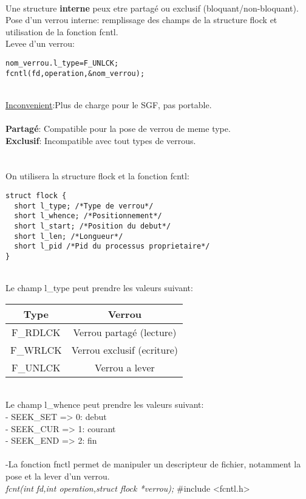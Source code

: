 \documentclass[a4paper,12pt,openany]{book}
\begin{document}
\\
Une structure \textbf{interne} peux etre partagé ou exclusif (bloquant/non-bloquant).\\
Pose d'un verrou interne: remplissage des champs de la structure flock et utilisation de la fonction fcntl.\\
Levee d'un verrou: \\
\begin{verbatim}
nom_verrou.l_type=F_UNLCK;
fcntl(fd,operation,&nom_verrou); 
\end{verbatim}
\\
\underline{Inconvenient}:Plus de charge pour le SGF, pas portable.\\
\\
\textbf{Partagé}: Compatible pour la pose de verrou de meme type.\\
\textbf{Exclusif}: Incompatible avec tout types de verrous.\\
\\
\\
On utilisera la structure flock et la fonction fcntl:
\begin{verbatim}
struct flock {
  short l_type; /*Type de verrou*/
  short l_whence; /*Positionnement*/
  short l_start; /*Position du debut*/
  short l_len; /*Longueur*/
  short l_pid /*Pid du processus proprietaire*/
}
\end{verbatim}
\\
Le champ l_type peut prendre les valeurs suivant:\\
\begin{tabular}{|c|c|}
\hline
Type & Verrou \\ \hline
F_RDLCK & Verrou partagé (lecture) \\
F_WRLCK & Verrou exclusif (ecriture) \\
F_UNLCK & Verrou a lever \\ \hline
\end{tabular}
\\
Le champ l_whence peut prendre les valeurs suivant:\\
- SEEK_SET => 0: debut\\
- SEEK_CUR => 1: courant\\
- SEEK_END => 2: fin\\ 
\\
-La fonction fnctl permet de manipuler un descripteur de fichier, notamment la pose et la lever d'un verrou.\\
\emph{fcnt(int fd,int operation,struct flock *verrou);} \#include <fcntl.h>\\
\end{document}
